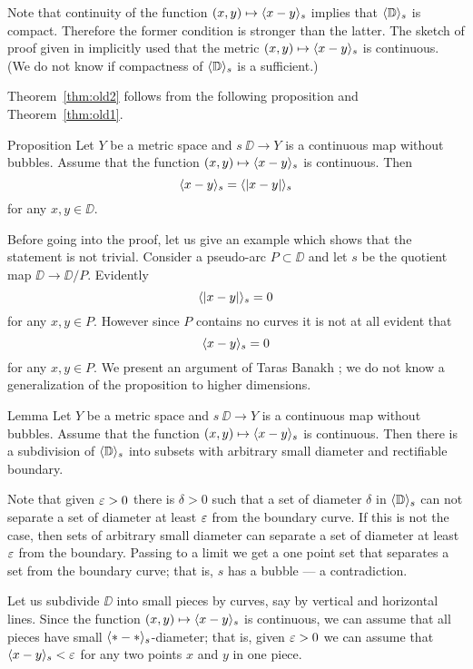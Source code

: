 Note that continuity of the function $(x,y)\mapsto\langle x-y\rangle_{s}$
implies that $\langle\mathbb{D}\rangle_s$ is compact.
Therefore the former condition is stronger than the latter.  
The sketch of proof given in \cite{petrunin-metric-min} implicitly used that the metric $(x,y)\zz\mapsto\<x-y\>_{s}$ is continuous.
(We do not know if compactness of $\langle\mathbb{D}\rangle_s$ is a sufficient.)

Theorem~\ref{thm:old2} follows from the following proposition and Theorem~\ref{thm:old1}.
 
\begin{thm}{Proposition}\label{prop:<||>=<>}
Let $Y$ be a metric space and $s\:\DD\to Y$ is a continuous map without bubbles.
Assume that the function $(x,y)\mapsto \langle x-y\rangle_s$ is continuous.
Then 
\[\langle x-y\rangle_s=\langle|x-y|\rangle_s\]
for any $x,y\in \DD$.
\end{thm}

Before going into the proof, let us give an example which shows that the statement is not trivial.
Consider a pseudo-arc $P\subset \DD$ and let $s$ be the quotient map $\DD\to \DD/P$.
Evidently 
\[\langle|x-y|\rangle_s=0\]
for any $x,y\in P$.
However since $P$ contains no curves it is not at all evident that 
\[\langle x-y\rangle_s=0\]
for any $x,y\in P$.
We present an argument of Taras Banakh \cite{banakh};
we do not know a generalization of the proposition to higher dimensions.

\begin{thm}{Lemma}\label{lem:subdivision}
Let $Y$ be a metric space and $s\:\DD\to Y$ is a continuous map without bubbles.
Assume that the function $(x,y)\mapsto \langle x-y\rangle_s$ is continuous.
Then there is a subdivision of $\langle\mathbb{D}\rangle_s$ into subsets with arbitrary small diameter and rectifiable boundary.
\end{thm}

Note that given $\varepsilon>0$ there is $\delta>0$ such that a set of diameter $\delta$ in $\langle\mathbb{D}\rangle_s$ can not separate a set of diameter at least $\varepsilon$ from the boundary curve.
If this is not the case, 
then sets of arbitrary small diameter can separate a set of diameter at least $\varepsilon$ from the boundary.
Passing to a limit we get a one point set that separates a set from the boundary curve; that is, $s$ has a bubble --- a contradiction. 

Let us subdivide $\DD$ into small pieces by curves, say by vertical and horizontal lines.
Since the function $(x,y)\mapsto \langle x-y\rangle_s$ is continuous,
we can assume that all pieces have small $\langle{*}-{*}\rangle_s$-diameter;
that is, given $\varepsilon>0$ we can assume that $\langle x-y\rangle_s<\varepsilon$ for any two points $x$ and $y$ in one piece.

